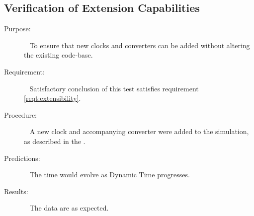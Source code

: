 \subsection{Verification of Extension Capabilities}
  \label{test:sim6}
\begin{description}
\item[Purpose:]\ \newline
To ensure that new clocks and converters can be added without altering the
existing code-base.

\item[Requirement:]\ \newline
Satisfactory conclusion of this test satisfies requirement
\ref{reqt:extensibility}.

\item[Procedure:]\ \newline
A new clock and accompanying converter were added to the simulation, as
described in the .

\item[Predictions:]\ \newline
The time would evolve as Dynamic Time progresses.

\item[Results:]\ \newline
The data are as expected.
\end{description}
